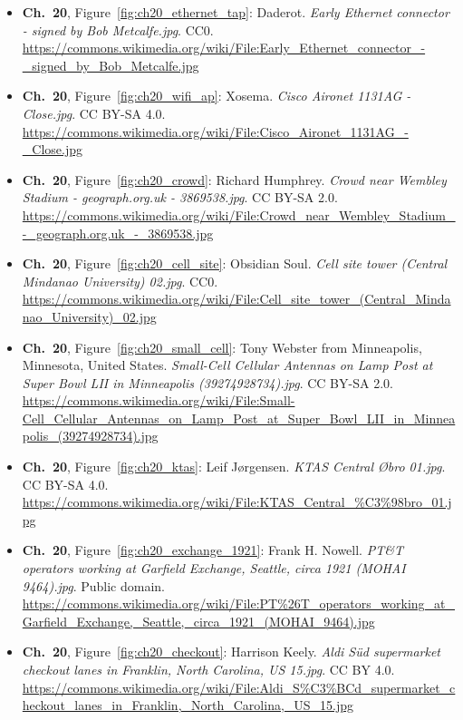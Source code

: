 \begin{small}
\begin{itemize}[leftmargin=0pt,itemsep=2pt,label={}]
\item \textbf{Ch.~20}, Figure~\ref{fig:ch20_ethernet_tap}: Daderot. \emph{Early Ethernet connector -\allowbreak{} signed by Bob Metcalfe.\allowbreak{}jpg}. CC0. \url{https://commons.wikimedia.org/wiki/File:Early_Ethernet_connector_-_signed_by_Bob_Metcalfe.jpg}
\item \textbf{Ch.~20}, Figure~\ref{fig:ch20_wifi_ap}: Xosema. \emph{Cisco Aironet 1131AG -\allowbreak{} Close.\allowbreak{}jpg}. CC BY-SA 4.0. \url{https://commons.wikimedia.org/wiki/File:Cisco_Aironet_1131AG_-_Close.jpg}
\item \textbf{Ch.~20}, Figure~\ref{fig:ch20_crowd}: Richard Humphrey. \emph{Crowd near Wembley Stadium -\allowbreak{} geograph.\allowbreak{}org.\allowbreak{}uk -\allowbreak{} 3869538.\allowbreak{}jpg}. CC BY-SA 2.0. \url{https://commons.wikimedia.org/wiki/File:Crowd_near_Wembley_Stadium_-_geograph.org.uk_-_3869538.jpg}
\item \textbf{Ch.~20}, Figure~\ref{fig:ch20_cell_site}: Obsidian Soul. \emph{Cell site tower (Central Mindanao University) 02.\allowbreak{}jpg}. CC0. \url{https://commons.wikimedia.org/wiki/File:Cell_site_tower_(Central_Mindanao_University)_02.jpg}
\item \textbf{Ch.~20}, Figure~\ref{fig:ch20_small_cell}: Tony Webster from Minneapolis, Minnesota, United States. \emph{Small-\allowbreak{}Cell Cellular Antennas on Lamp Post at Super Bowl LII in Minneapolis (39274928734).\allowbreak{}jpg}. CC BY-SA 2.0. \url{https://commons.wikimedia.org/wiki/File:Small-Cell_Cellular_Antennas_on_Lamp_Post_at_Super_Bowl_LII_in_Minneapolis_(39274928734).jpg}
\item \textbf{Ch.~20}, Figure~\ref{fig:ch20_ktas}: Leif Jørgensen. \emph{KTAS Central Øbro 01.\allowbreak{}jpg}. CC BY-SA 4.0. \url{https://commons.wikimedia.org/wiki/File:KTAS_Central_%C3%98bro_01.jpg}
\item \textbf{Ch.~20}, Figure~\ref{fig:ch20_exchange_1921}: Frank H. Nowell. \emph{PT\&T operators working at Garfield Exchange, Seattle, circa 1921 (MOHAI 9464).\allowbreak{}jpg}. Public domain. \url{https://commons.wikimedia.org/wiki/File:PT%26T_operators_working_at_Garfield_Exchange,_Seattle,_circa_1921_(MOHAI_9464).jpg}
\item \textbf{Ch.~20}, Figure~\ref{fig:ch20_checkout}: Harrison Keely. \emph{Aldi Süd supermarket checkout lanes in Franklin, North Carolina, US 15.\allowbreak{}jpg}. CC BY 4.0. \url{https://commons.wikimedia.org/wiki/File:Aldi_S%C3%BCd_supermarket_checkout_lanes_in_Franklin,_North_Carolina,_US_15.jpg}

\end{itemize}
\end{small}
